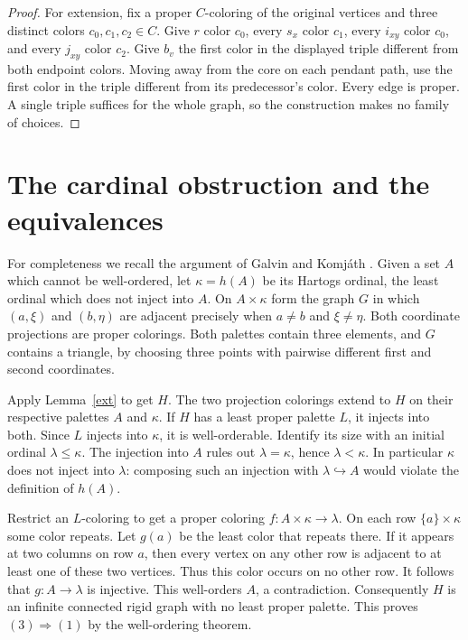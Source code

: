 \documentclass[11pt]{article}
\begin{document}
\begin{proof}
For extension, fix a proper $C$-coloring of the original vertices and three distinct colors $c_0,c_1,c_2\in C$. Give $r$ color $c_0$, every $s_x$ color $c_1$, every $i_{xy}$ color $c_0$, and every $j_{xy}$ color $c_2$. Give $b_v$ the first color in the displayed triple different from both endpoint colors. Moving away from the core on each pendant path, use the first color in the triple different from its predecessor's color. Every edge is proper. A single triple suffices for the whole graph, so the construction makes no family of choices.
\end{proof}

\section*{The cardinal obstruction and the equivalences}

For completeness we recall the argument of Galvin and Komj\'ath \cite[Lemmas 1--2]{gk}. Given a set $A$ which cannot be well-ordered, let $\kappa=h(A)$ be its Hartogs ordinal, the least ordinal which does not inject into $A$. On $A\times\kappa$ form the graph $G$ in which $(a,\xi)$ and $(b,\eta)$ are adjacent precisely when $a\ne b$ and $\xi\ne\eta$. Both coordinate projections are proper colorings. Both palettes contain three elements, and $G$ contains a triangle, by choosing three points with pairwise different first and second coordinates.

Apply Lemma~\ref{ext} to get $H$. The two projection colorings extend to $H$ on their respective palettes $A$ and $\kappa$. If $H$ has a least proper palette $L$, it injects into both. Since $L$ injects into $\kappa$, it is well-orderable. Identify its size with an initial ordinal $\lambda\le\kappa$. The injection into $A$ rules out $\lambda=\kappa$, hence $\lambda<\kappa$. In particular $\kappa$ does not inject into $\lambda$: composing such an injection with $\lambda\hookrightarrow A$ would violate the definition of $h(A)$.

Restrict an $L$-coloring to get a proper coloring $f:A\times\kappa\to\lambda$. On each row $\{a\}\times\kappa$ some color repeats. Let $g(a)$ be the least color that repeats there. If it appears at two columns on row $a$, then every vertex on any other row is adjacent to at least one of these two vertices. Thus this color occurs on no other row. It follows that $g:A\to\lambda$ is injective. This well-orders $A$, a contradiction. Consequently $H$ is an infinite connected rigid graph with no least proper palette. This proves $(3)\Rightarrow(1)$ by the well-ordering theorem.
\end{document}
